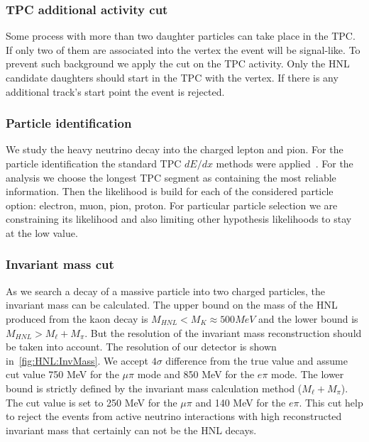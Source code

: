 \documentclass[../main.tex]{subfiles}
\begin{document}
\subsubsection{TPC additional activity cut}
Some process with more than two daughter particles can take place in the TPC. If only two of them are associated into the vertex the event will be signal-like. To prevent such background we apply the cut on the TPC activity. Only the HNL candidate daughters should start in the TPC with the vertex. If there is any additional track's start point the event is rejected.

\subsubsection{Particle identification}
We study the heavy neutrino decay into the charged lepton and pion. For the particle identification the standard TPC $dE/dx$ methods were applied~\cite{Abgrall2011}. For the analysis we choose the longest TPC segment as containing the most reliable information. Then the likelihood is build for each of the considered particle option: electron, muon, pion, proton. For particular particle selection we are constraining its likelihood and also limiting other hypothesis likelihoods to stay at the low value.

\subsubsection{Invariant mass cut}
As we search a decay of a massive particle into two charged particles, the invariant mass can be calculated. The upper bound on the mass of the HNL produced from the kaon decay is $M_{HNL}<M_K\approx500MeV$ and the lower bound is $M_{HNL}>M_\ell+M_\pi$. But the resolution of the invariant mass reconstruction should be taken into account. The resolution of our detector is shown in~\autoref{fig:HNL:InvMass}. We accept $4\sigma$ difference from the true value and assume cut value 750 MeV for the $\mu\pi$ mode and 850 MeV for the $e\pi$ mode. The lower bound is strictly defined by the invariant mass calculation method ($M_\ell+M_\pi$). The cut value is set to 250 MeV for the $\mu\pi$ and 140 MeV for the $e\pi$. This cut help to reject the events from active neutrino interactions with high reconstructed invariant mass that certainly can not be the HNL decays.
\end{document}
